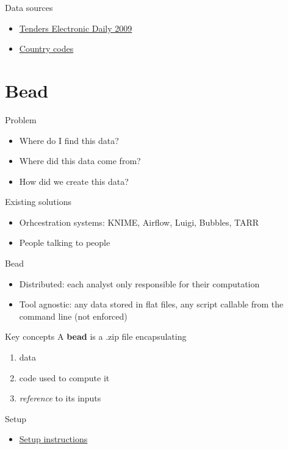 \documentclass[
  ignorenonframetext,
  aspectratio=54,
]{beamer}
\providecommand{\tightlist}{%
  \setlength{\itemsep}{0pt}\setlength{\parskip}{0pt}}
\begin{document}
\begin{frame}{Data sources}
\protect\hypertarget{data-sources}{}
\begin{itemize}
\tightlist
\item
  \href{https://data.europa.eu/euodp/en/data/dataset/ted-csv/resource/7caee4eb-0fc0-4fc0-ad1a-c970e63b40b4}{Tenders
  Electronic Daily 2009}
\item
  \href{https://www.datahub.io/core/country-codes}{Country codes}
\end{itemize}
\end{frame}

\hypertarget{bead}{%
\section{Bead}\label{bead}}

\begin{frame}{Problem}
\protect\hypertarget{problem}{}
\begin{itemize}
\tightlist
\item
  Where do I find this data?
\item
  Where did this data come from?
\item
  How did we create this data?
\end{itemize}
\end{frame}

\begin{frame}{Existing solutions}
\protect\hypertarget{existing-solutions}{}
\begin{itemize}
\tightlist
\item
  Orhcestration systems: KNIME, Airflow, Luigi, Bubbles, TARR
\item
  People talking to people
\end{itemize}
\end{frame}

\begin{frame}{Bead}
\protect\hypertarget{bead-1}{}
\begin{itemize}
\tightlist
\item
  Distributed: each analyst only responsible for their computation
\item
  Tool agnostic: any data stored in flat files, any script callable from
  the command line (not enforced)
\end{itemize}
\end{frame}

\begin{frame}{Key concepts}
\protect\hypertarget{key-concepts}{}
A \textbf{bead} is a .zip file encapsulating

\begin{enumerate}
\tightlist
\item
  data
\item
  code used to compute it
\item
  \emph{reference} to its inputs
\end{enumerate}
\end{frame}

\begin{frame}{Setup}
\protect\hypertarget{setup}{}
\begin{itemize}
\tightlist
\item
  \href{https://handbook.microdata.io/onboarding/setup\#bead}{Setup
  instructions}
\end{itemize}
\end{frame}
\end{document}
